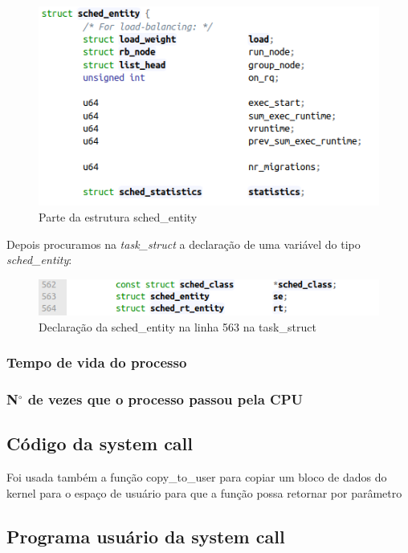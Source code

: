 \documentclass[12pt]{article}
\begin{document}
\begin{figure}[!htb]
	\centering
	\includegraphics[scale=0.4]{imagens/img2.png}
	\caption{Parte da estrutura sched\_entity}
	\label{schedentity}
\end{figure}

Depois procuramos na \textit{task\_struct} a declaração de uma variável do tipo \textit{sched\_entity}:

\begin{figure}[!htb]
	\centering
	\includegraphics[scale=0.8]{imagens/img3.png}
	\caption{Declaração da sched\_entity na linha 563 na task\_struct}
	\label{decschedentity}
\end{figure}




\subsubsection*{Tempo de vida do processo}
\subsubsection*{N$^{\circ}$  de vezes que o processo passou pela CPU}
\subsection*{Código da system call}
Foi usada também a função copy\_to\_user para copiar um bloco de dados do kernel para o espaço de usuário para que a função possa retornar por parâmetro

\subsection*{Programa usuário da system call}






\end{document}
